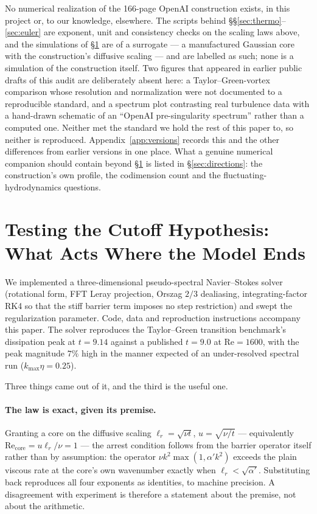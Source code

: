 \documentclass[11pt,a4paper]{article}
\begin{document}
No numerical realization of the 166-page OpenAI construction exists, in this project or, to our
knowledge, elsewhere. The scripts behind \S\S\ref{sec:thermo}--\ref{sec:euler} are exponent, unit and
consistency checks on the scaling laws above, and the simulations of \S\ref{sec:cutoff-tested} are
of a surrogate --- a manufactured Gaussian core with the construction's diffusive scaling --- and are
labelled as such; none is a simulation of the construction itself. Two figures that appeared in earlier public drafts of this audit are
deliberately absent here: a Taylor--Green-vortex comparison whose resolution and normalization were
not documented to a reproducible standard, and a spectrum plot contrasting real turbulence data with
a hand-drawn schematic of an ``OpenAI pre-singularity spectrum'' rather than a computed one. Neither
met the standard we hold the rest of this paper to, so neither is reproduced. Appendix~\ref{app:versions}
records this and the other differences from earlier versions in one place. What a genuine numerical
companion should contain beyond \S\ref{sec:cutoff-tested} is listed in \S\ref{sec:directions}: the
construction's own profile, the codimension count and the fluctuating-hydrodynamics questions.

\section{Testing the Cutoff Hypothesis: What Acts Where the Model Ends}
\label{sec:cutoff-tested}

We implemented a three-dimensional pseudo-spectral Navier--Stokes solver (rotational form, FFT
Leray projection, Orszag $2/3$ dealiasing, integrating-factor RK4 so that the stiff barrier term
imposes no step restriction) and swept the regularization parameter. Code, data and reproduction
instructions accompany this paper. The solver reproduces the Taylor--Green transition benchmark's
dissipation peak at $t=9.14$ against a published $t=9.0$ at $\mathrm{Re}=1600$, with the peak
magnitude $7\%$ high in the manner expected of an under-resolved spectral run
($k_{\max}\eta=0.25$).

Three things came out of it, and the third is the useful one.

\paragraph{The law is exact, given its premise.} Granting a core on the diffusive scaling
$\ell_r=\sqrt{\nu t}$, $u=\sqrt{\nu/t}$ --- equivalently $\mathrm{Re}_{\text{core}}=u\ell_r/\nu=1$
--- the arrest condition follows from the barrier operator itself rather than by assumption: the
operator $\nu k^2\max(1,\alpha'k^2)$ exceeds the plain viscous rate at the core's own wavenumber
exactly when $\ell_r<\sqrt{\alpha'}$. Substituting back reproduces all four exponents as
identities, to machine precision. A disagreement with experiment is therefore a statement about the
premise, not about the arithmetic.
\end{document}
